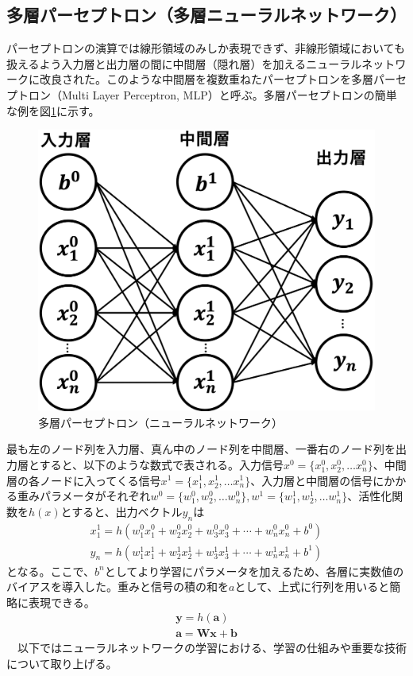 \subsection{多層パーセプトロン（多層ニューラルネットワーク）}
パーセプトロンの演算では線形領域のみしか表現できず、非線形領域においても扱えるよう入力層と出力層の間に中間層（隠れ層）を加えるニューラルネットワークに改良された。このような中間層を複数重ねたパーセプトロンを多層パーセプトロン（Multi Layer Perceptron, MLP）と呼ぶ。多層パーセプトロンの簡単な例を図\ref{mlp}に示す。\\
\begin{figure}[H]
	\begin{center}
 \includegraphics[keepaspectratio, scale=0.2]
 	{Figure/Deeplearning/mlp.png}
 		\caption{多層パーセプトロン（ニューラルネットワーク）}
 		\label{mlp}
	\end{center}
\end{figure}
最も左のノード列を入力層、真ん中のノード列を中間層、一番右のノード列を出力層とすると、以下のような数式で表される。入力信号$x^0 = \{ x_1^0, x_2^0, \ldots x_n^0 \}$、中間層の各ノードに入ってくる信号$x^1 = \{ x_1^1, x_2^1, \ldots x_n^1 \}$、入力層と中間層の信号にかかる重みパラメータがそれぞれ$w^0 = \{ w_1^0, w_2^0, \ldots w_n^0 \}, w^1 = \{ w_1^1, w_2^1, \ldots w_n^1 \}$、活性化関数を$h(x)$とすると、出力ベクトル$y_n$は
\begin{align}
x_1^1 = h(w_1^0 x_1^0 + w_2^0 x_2^0 + w_3^0 x_3^0 + \cdots + w_n^0 x_n^0 + b^0)\\
y_n = h(w_1^1 x_1^1 + w_2^1 x_2^1 + w_3^1 x_3^1 + \cdots + w_n^1 x_n^1 + b^1)
\end{align}
となる。ここで、$b^n$としてより学習にパラメータを加えるため、各層に実数値のバイアスを導入した。重みと信号の積の和を$a$として、上式に行列を用いると簡略に表現できる。\\
\begin{align}
\mathbf{y} = h(\mathbf{a})\\
\mathbf{a} = \mathbf{W} \mathbf{x} + \mathbf{b}
\end{align}
　以下ではニューラルネットワークの学習における、学習の仕組みや重要な技術について取り上げる。
